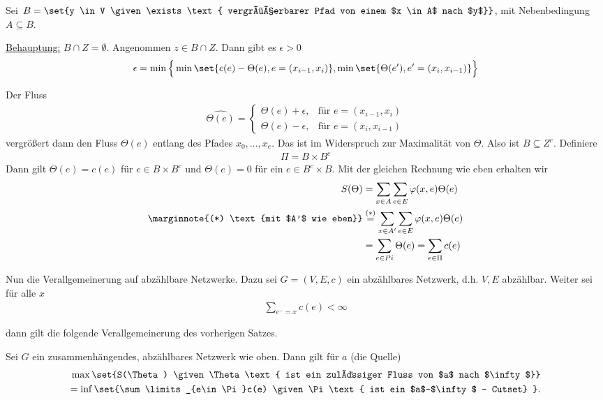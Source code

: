 \begin{beweis}
	Sei $B= \set{y \in V \given \exists \text{ vergrößerbarer Pfad von einem $x \in A$ nach $y$}}$, mit Nebenbedingung $A\subseteq B$.
	
	\underline{Behauptung:} $B \cap Z = \emptyset$. Angenommen $z \in B \cap Z$. Dann gibt es $\epsilon > 0$
	\begin{align}
		\epsilon = \min\Big\{\min\set{c(e) -\Theta(e), e = (x_{i-1},x_i)}, \min\set{\Theta(e'), e' = (x_i,x_{i-1})}\Big\}
	\end{align}
	
	Der Fluss \begin{align}
		\hat{\Theta(e)} = 
			\begin{cases}
				\Theta(e) + \epsilon, & \text{für } e = (x_{i-1},x_i)\\
 				\Theta(e) - \epsilon, & \text{für } e = (x_i,x_{i-1})
			\end{cases}
	\end{align}
	vergrößert dann den Fluss $\Theta(e)$ entlang des Pfades $x_0, \dots, x_e$. Das ist im Widerspruch zur Maximalität von $\Theta$. Also ist $B \subseteq Z^c$. Definiere
	\begin{align}
		\Pi = B \times B^c%
	\end{align} 
	Dann gilt $\Theta(e) = c(e)$ für $e \in B \times B^c$ und $\Theta(e) = 0$ für ein $e \in B^c \times B$. Mit der gleichen Rechnung wie eben erhalten wir 
	\begin{align} 
		S(\Theta) &= \sum\limits_{x\in A} \sum\limits_{e \in E} \phi(x,e) \Theta(e)\\ \marginnote{(*) \text{mit $A'$ wie eben}}
				&\overset{(*)}{=} \sum\limits_{x \in A'} \sum\limits_{e \in E} \phi(x,e) \Theta(e) \\
				&= \sum\limits_{e \in Pi}\Theta(e) = \sum\limits_{e \in \Pi}c(e) 
	\end{align}
\end{beweis}
Nun die Verallgemeinerung auf abzählbare Netzwerke. Dazu sei $G= (V,E,c)$ ein abzählbares Netzwerk, d.h. $V,E$ abzählbar. Weiter sei für alle $x$ 
\begin{align}
	\sum\limits_{e ^- = x} c(e) < \infty
\end{align}

dann gilt die folgende Verallgemeinerung des vorherigen Satzes.

\begin{satz}
	\label{satz:5-4}
	Sei $G$ ein zusammenhängendes, abzählbares Netzwerk wie oben. Dann gilt für $a$ (die Quelle)
	\begin{align}
		\max\set{S(\Theta) \given \Theta \text{ ist ein zulässiger Fluss von $a$ nach $\infty$}} \\
		=\inf\set{\sum\limits_{e\in\Pi}c(e) \given \Pi \text{ ist ein $a$--$\infty$ -- Cutset} }.
	\end{align}
\end{satz}


